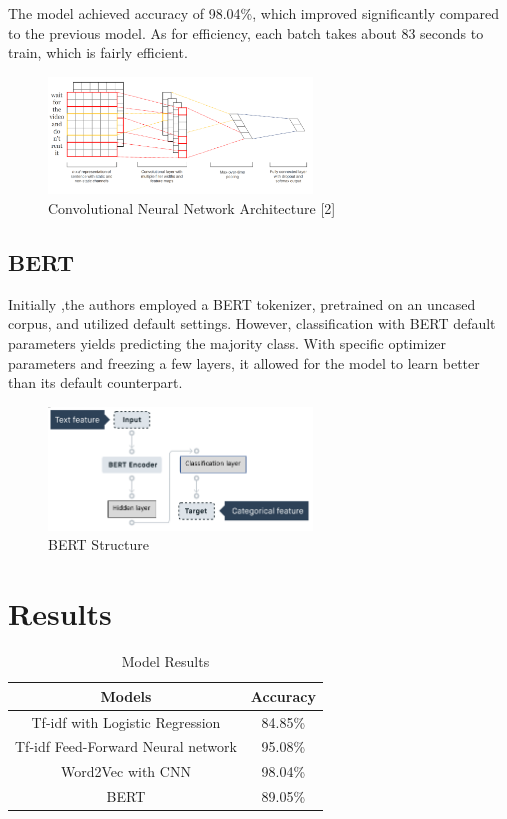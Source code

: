 \documentclass[conference]{IEEEtran}
\begin{document}
The model achieved accuracy of 98.04\%, which improved significantly compared to the previous model. As for efficiency, each batch takes about 83 seconds to train, which is fairly efficient.

\begin{figure}[htbp]
\centerline{\includegraphics[width=70mm]{fig2.png}}
\caption{Convolutional Neural Network Architecture [2]}
\label{fig}
\end{figure}

\subsection{BERT}

Initially ,the authors employed a BERT tokenizer, pretrained on an uncased corpus, and utilized default settings. However, classification with BERT default parameters yields predicting the majority class. With specific optimizer parameters and freezing a few layers, it allowed for the model to learn better than its default counterpart.

\begin{figure}[htbp]
\centerline{\includegraphics[width=70mm]{fig3.png}}
\caption{BERT Structure}
\label{fig}
\end{figure}

\section{Results}

\begin{table}[htbp]
\caption{Model Results}
\begin{center}
\begin{tabular}{|c|l|l|l|l|l|l|c|l|l|}
\hline
\multicolumn{7}{|c|}{\textbf{Models}}    & \multicolumn{3}{c|}{\textbf{Accuracy}} \\ \hline
\multicolumn{7}{|c|}{Tf-idf with Logistic Regression}  & \multicolumn{3}{c|}{84.85\%}     \\ \hline
\multicolumn{7}{|c|}{Tf-idf Feed-Forward Neural network} & \multicolumn{3}{c|}{95.08\%}     \\ \hline
\multicolumn{7}{|c|}{Word2Vec with CNN}   & \multicolumn{3}{c|}{98.04\%}     \\ \hline
\multicolumn{7}{|c|}{BERT}      & \multicolumn{3}{c|}{89.05\%}     \\ \hline
\end{tabular}
\label{tab1}
\end{center}
\end{table}
\end{document}
